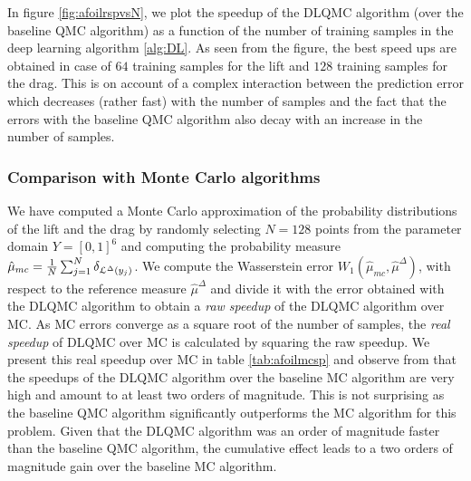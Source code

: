 \documentclass[a4paper]{article}
\numberwithin{equation}{section}
\numberwithin{equation}{section}
\theoremstyle{definition}
\theoremstyle{myremarkstyle}
\newcommand{\map}{\EuScript{L}}
\begin{document}
In figure \ref{fig:afoilrspvsN}, we plot the speedup of the DLQMC algorithm (over the baseline QMC algorithm) as a function of the number of training samples in the deep learning algorithm \ref{alg:DL}. As seen from the figure, the best speed ups are obtained in case of $64$ training samples for the lift and $128$ training samples for the drag. This is on account of a complex interaction between the prediction error which decreases (rather fast) with the number of samples and the fact that the errors with the baseline QMC algorithm also decay with an increase in the number of samples. 
\subsubsection{Comparison with Monte Carlo algorithms}
We have computed a Monte Carlo approximation of the probability distributions of the lift and the drag by randomly selecting $N=128$ points from the parameter domain $Y = [0,1]^6$ and computing the probability measure $\hat{\mu}_{mc} = \frac{1}{N} \sum_{j=1}^N \delta_{\map^{\Delta}(y_j)}$. We compute the Wasserstein error $W_1(\hat{\mu}_{mc}, \hat{\mu}^{\Delta})$, with respect to the reference measure $\hat{\mu}^{\Delta}$ and divide it with the error obtained with the DLQMC algorithm to obtain a \emph{raw speedup} of the DLQMC algorithm over MC. As MC errors converge as a square root of the number of samples, the \emph{real speedup} of DLQMC over MC is calculated by squaring the raw speedup. We present this real speedup over MC in table \ref{tab:afoilmcsp} and observe from that the speedups of the DLQMC algorithm over the baseline MC algorithm are very high and amount to at least two orders of magnitude. This is not surprising as the baseline QMC algorithm significantly outperforms the MC algorithm for this problem. Given that the DLQMC algorithm was an order of magnitude faster than the baseline QMC algorithm, the cumulative effect leads to a two orders of magnitude gain over the baseline MC algorithm. 
\end{document}
